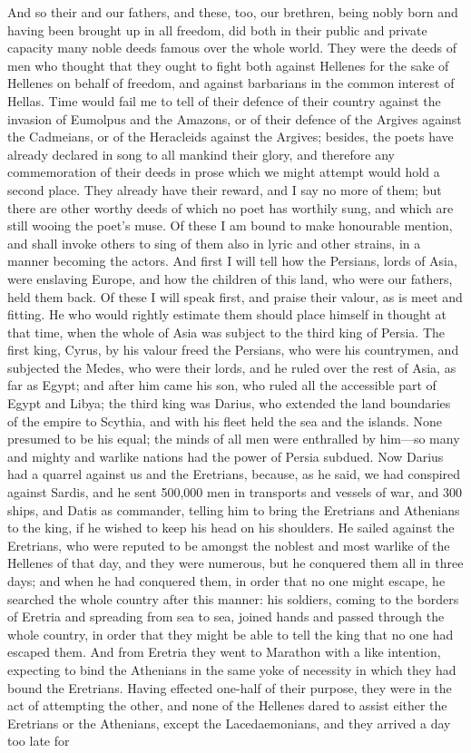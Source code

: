 \documentclass[11pt,letter]{article}
\begin{document}
\par  And so their and our fathers, and these, too, our brethren, being nobly born and having been brought up in all freedom, did both in their public and private capacity many noble deeds famous over the whole world. They were the deeds of men who thought that they ought to fight both against Hellenes for the sake of Hellenes on behalf of freedom, and against barbarians in the common interest of Hellas. Time would fail me to tell of their defence of their country against the invasion of Eumolpus and the Amazons, or of their defence of the Argives against the Cadmeians, or of the Heracleids against the Argives; besides, the poets have already declared in song to all mankind their glory, and therefore any commemoration of their deeds in prose which we might attempt would hold a second place. They already have their reward, and I say no more of them; but there are other worthy deeds of which no poet has worthily sung, and which are still wooing the poet's muse. Of these I am bound to make honourable mention, and shall invoke others to sing of them also in lyric and other strains, in a manner becoming the actors. And first I will tell how the Persians, lords of Asia, were enslaving Europe, and how the children of this land, who were our fathers, held them back. Of these I will speak first, and praise their valour, as is meet and fitting. He who would rightly estimate them should place himself in thought at that time, when the whole of Asia was subject to the third king of Persia. The first king, Cyrus, by his valour freed the Persians, who were his countrymen, and subjected the Medes, who were their lords, and he ruled over the rest of Asia, as far as Egypt; and after him came his son, who ruled all the accessible part of Egypt and Libya; the third king was Darius, who extended the land boundaries of the empire to Scythia, and with his fleet held the sea and the islands. None presumed to be his equal; the minds of all men were enthralled by him—so many and mighty and warlike nations had the power of Persia subdued. Now Darius had a quarrel against us and the Eretrians, because, as he said, we had conspired against Sardis, and he sent 500,000 men in transports and vessels of war, and 300 ships, and Datis as commander, telling him to bring the Eretrians and Athenians to the king, if he wished to keep his head on his shoulders. He sailed against the Eretrians, who were reputed to be amongst the noblest and most warlike of the Hellenes of that day, and they were numerous, but he conquered them all in three days; and when he had conquered them, in order that no one might escape, he searched the whole country after this manner: his soldiers, coming to the borders of Eretria and spreading from sea to sea, joined hands and passed through the whole country, in order that they might be able to tell the king that no one had escaped them. And from Eretria they went to Marathon with a like intention, expecting to bind the Athenians in the same yoke of necessity in which they had bound the Eretrians. Having effected one-half of their purpose, they were in the act of attempting the other, and none of the Hellenes dared to assist either the Eretrians or the Athenians, except the Lacedaemonians, and they arrived a day too late for 
\end{document}
